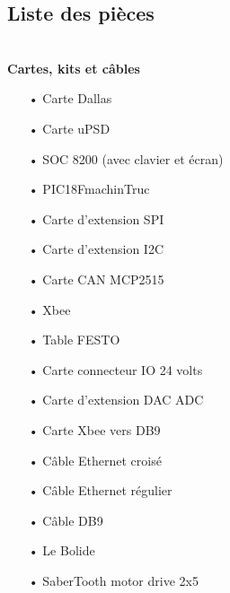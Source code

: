 \documentclass[10pt,a4paper,final]{article}
\begin{document}
\begin{spacing}{1.5}
\section{Liste des pièces}
\begin{center}
\HRule \\
\textbf{Cartes, kits et câbles}
\end{center}
\begin{multicols}{3}
\begin{itemize}
\item[•]Carte Dallas
\item[•]Carte uPSD
\item[•]SOC 8200 (avec clavier et écran)
\item[•]PIC18FmachinTruc
\item[•]Carte d'extension SPI
\item[•]Carte d'extension I2C
\item[•]Carte CAN MCP2515
\item[•]Xbee
\item[•]Table FESTO
\item[•]Carte connecteur IO 24 volts
\item[•]Carte d'extension DAC ADC
\item[•]Carte Xbee vers DB9
\item[•]Câble Ethernet croisé
\item[•]Câble Ethernet régulier
\item[•]Câble DB9
\item[•]Le Bolide
\item[•]SaberTooth motor drive 2x5
\end{itemize}
\end{multicols}



\end{spacing}
\end{document}

